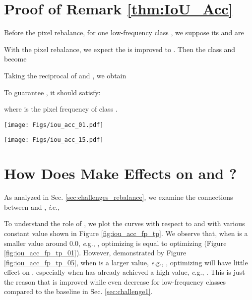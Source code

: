 \documentclass[final]{cvpr}
\begin{document}
\vspace{0.5in}
\section{Proof of Remark \ref{thm:IoU_Acc}}
\noindent Before the pixel rebalance, for one low-frequency class , we suppose its  and  are

With the pixel rebalance, we expect the  is improved to . Then the class  and  become

Taking the reciprocal of  and , we obtain

To guarantee , it should satisfy:

where  is the pixel frequency of class .


\newpage
\begin{figure*}[h]
	\begin{center}
		\begin{minipage}[t]{0.48\textwidth} 
			\begin{center}
				\texttt{[image: Figs/iou\_acc\_01.pdf]} 
				\label{fig:iou_acc_fp_tp_01} 
			\end{center} 
		\end{minipage} 
		\hspace{0.05in}
		\begin{minipage}[t]{0.48\textwidth} 
			\begin{center}
				\texttt{[image: Figs/iou\_acc\_15.pdf]} 
				\label{fig:iou_acc_fp_tp_05} 
			\end{center}
		\end{minipage}
	\end{center}
	\caption{The effects of  on  and .}
	\label{fig:iou_acc_fp_tp}
\end{figure*}


\section{How Does  Make Effects on  and ?}
\noindent As analyzed in Sec. \ref{sec:challenges_rebalance}, we examine the connections between  and , {\textit i.e.},

To understand the role of , we plot the curves with respect to  and  with various constant value  shown in Figure \ref{fig:iou_acc_fp_tp}. We observe that, when  is a smaller value around 0.0, {\textit e.g.}, , optimizing  is equal to optimizing  (Figure \ref{fig:iou_acc_fp_tp_01}). However, demonstrated by Figure \ref{fig:iou_acc_fp_tp_05}, when  is a larger value, {\textit e.g.}, , optimizing  will have little effect on , especially when  has already achieved a high value, {\textit e.g.}, . This is just the reason that  is improved while  even decrease for low-frequency classes compared to the baseline in Sec. \ref{sec:challenge1}.
\end{document}
